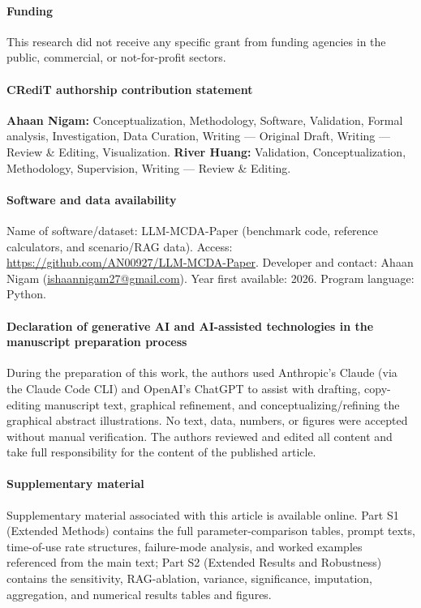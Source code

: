 \documentclass[final,3p,times]{elsarticle}
\begin{document}
\paragraph*{Funding}
This research did not receive any specific grant from funding agencies in the public, commercial, or not-for-profit sectors.

\paragraph*{CRediT authorship contribution statement}
\textbf{Ahaan Nigam:} Conceptualization, Methodology, Software, Validation, Formal analysis, Investigation, Data Curation, Writing --- Original Draft, Writing --- Review \& Editing, Visualization. \textbf{River Huang:} Validation, Conceptualization, Methodology, Supervision, Writing --- Review \& Editing.

\paragraph*{Software and data availability}
Name of software/dataset: LLM-MCDA-Paper (benchmark code, reference calculators, and scenario/RAG data). Access: \url{https://github.com/AN00927/LLM-MCDA-Paper}.
Developer and contact: Ahaan Nigam (\href{mailto:ishaannigam27@gmail.com}{ishaannigam27@gmail.com}). 
Year first available: 2026. 
Program language: Python. 

\paragraph*{Declaration of generative AI and AI-assisted technologies in the manuscript preparation process}
During the preparation of this work, the authors used Anthropic's Claude (via the Claude Code CLI) and OpenAI's ChatGPT to assist with drafting, copy-editing manuscript text, graphical refinement, and conceptualizing/refining the graphical abstract illustrations. No text, data, numbers, or figures were accepted without manual verification. The authors reviewed and edited all content and take full responsibility for the content of the published article.

\paragraph*{Supplementary material}
Supplementary material associated with this article is available online. Part S1 (Extended Methods) contains the full parameter-comparison tables, prompt texts, time-of-use rate structures, failure-mode analysis, and worked examples referenced from the main text; Part S2 (Extended Results and Robustness) contains the sensitivity, RAG-ablation, variance, significance, imputation, aggregation, and numerical results tables and figures.
\end{document}
